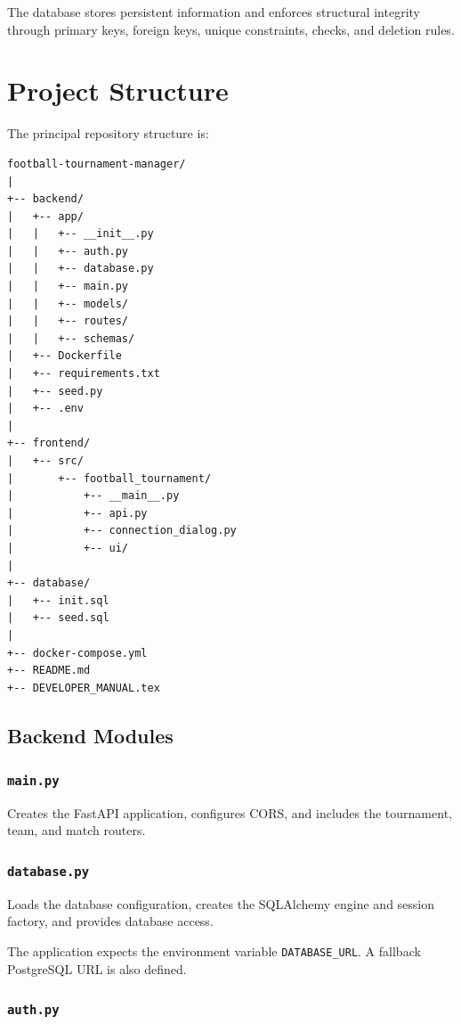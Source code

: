 \documentclass[12pt,a4paper]{article}
\begin{document}
The database stores persistent information and enforces structural
integrity through primary keys, foreign keys, unique constraints,
checks, and deletion rules.


\section{Project Structure}

The principal repository structure is:

\begin{lstlisting}
football-tournament-manager/
|
+-- backend/
|   +-- app/
|   |   +-- __init__.py
|   |   +-- auth.py
|   |   +-- database.py
|   |   +-- main.py
|   |   +-- models/
|   |   +-- routes/
|   |   +-- schemas/
|   +-- Dockerfile
|   +-- requirements.txt
|   +-- seed.py
|   +-- .env
|
+-- frontend/
|   +-- src/
|       +-- football_tournament/
|           +-- __main__.py
|           +-- api.py
|           +-- connection_dialog.py
|           +-- ui/
|
+-- database/
|   +-- init.sql
|   +-- seed.sql
|
+-- docker-compose.yml
+-- README.md
+-- DEVELOPER_MANUAL.tex
\end{lstlisting}

\subsection{Backend Modules}

\subsubsection{\texttt{main.py}}

Creates the FastAPI application, configures CORS, and includes the
tournament, team, and match routers.

\subsubsection{\texttt{database.py}}

Loads the database configuration, creates the SQLAlchemy engine and
session factory, and provides database access.

The application expects the environment variable
\texttt{DATABASE\_URL}. A fallback PostgreSQL URL is also defined.

\subsubsection{\texttt{auth.py}}
\end{document}
